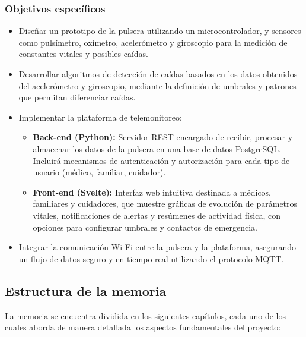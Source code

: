 \documentclass[12pt, a4paper]{article}
\begin{document}
	\subsubsection{Objetivos específicos}
	\begin{itemize}
		\item Diseñar un prototipo de la pulsera utilizando un microcontrolador, y sensores como pulsímetro, oxímetro, acelerómetro y giroscopio para la medición de constantes vitales y posibles caídas.
		
		\item Desarrollar algoritmos de detección de caídas basados en los datos obtenidos del acelerómetro y giroscopio, mediante la definición de umbrales y patrones que permitan diferenciar caídas.
		
		\item Implementar la plataforma de telemonitoreo:
		\begin{itemize}
			\item \textbf{Back-end (Python):} Servidor REST encargado de recibir, procesar y almacenar los datos de la pulsera en una base de datos PostgreSQL. Incluirá mecanismos de autenticación y autorización para cada tipo de usuario (médico, familiar, cuidador).
			
			\item \textbf{Front-end (Svelte):} Interfaz web intuitiva destinada a médicos, familiares y cuidadores, que muestre gráficas de evolución de parámetros vitales, notificaciones de alertas y resúmenes de actividad física, con opciones para configurar umbrales y contactos de emergencia.
		\end{itemize}
		
		\item Integrar la comunicación Wi-Fi entre la pulsera y la plataforma, asegurando un flujo de datos seguro y en tiempo real utilizando el protocolo MQTT.
		
		
	\end{itemize}

	
	\subsection{Estructura de la memoria}
	
	La memoria se encuentra dividida en los siguientes capítulos, cada uno de los cuales aborda de manera detallada los aspectos fundamentales del proyecto:
	
\end{document}

